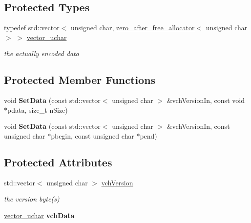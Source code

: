 \subsection*{Protected Types}
\begin{DoxyCompactItemize}
\item 
\mbox{\label{class_c_base58_data_a193d64487a0b4f6df24f8bd380956ec1}} 
typedef std\+::vector$<$ unsigned char, \mbox{\hyperlink{structzero__after__free__allocator}{zero\+\_\+after\+\_\+free\+\_\+allocator}}$<$ unsigned char $>$ $>$ \mbox{\hyperlink{class_c_base58_data_a193d64487a0b4f6df24f8bd380956ec1}{vector\+\_\+uchar}}
\begin{DoxyCompactList}\small\item\em the actually encoded data \end{DoxyCompactList}\end{DoxyCompactItemize}
\subsection*{Protected Member Functions}
\begin{DoxyCompactItemize}
\item 
\mbox{\label{class_c_base58_data_afab1c06a0a4f631fd889434a2bc48c27}} 
void {\bfseries Set\+Data} (const std\+::vector$<$ unsigned char $>$ \&vch\+Version\+In, const void $\ast$pdata, size\+\_\+t n\+Size)
\item 
\mbox{\label{class_c_base58_data_a8314b00685e590b4005be5cdfd36aeb9}} 
void {\bfseries Set\+Data} (const std\+::vector$<$ unsigned char $>$ \&vch\+Version\+In, const unsigned char $\ast$pbegin, const unsigned char $\ast$pend)
\end{DoxyCompactItemize}
\subsection*{Protected Attributes}
\begin{DoxyCompactItemize}
\item 
\mbox{\label{class_c_base58_data_a110c1008f399053098a1bdf63408e923}} 
std\+::vector$<$ unsigned char $>$ \mbox{\hyperlink{class_c_base58_data_a110c1008f399053098a1bdf63408e923}{vch\+Version}}
\begin{DoxyCompactList}\small\item\em the version byte(s) \end{DoxyCompactList}\item 
\mbox{\label{class_c_base58_data_ae7ef7dfb93683aa4aaee8b74da5abb9c}} 
\mbox{\hyperlink{class_c_base58_data_a193d64487a0b4f6df24f8bd380956ec1}{vector\+\_\+uchar}} {\bfseries vch\+Data}
\end{DoxyCompactItemize}



